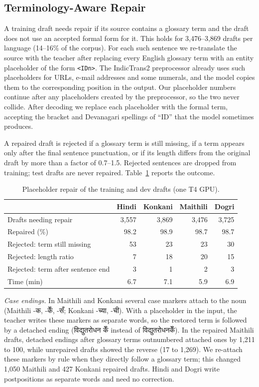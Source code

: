 \documentclass[conference]{IEEEtran}
\newcommand{\dev}[1]{{\devfont #1}}
\begin{document}
\subsection{Terminology-Aware Repair}
A training draft needs repair if its source contains a glossary term and the draft does not use an accepted formal form for it. This holds for 3,476--3,869 drafts per language (14--16\% of the corpus). For each such sentence we re-translate the source with the teacher after replacing every English glossary term with an entity placeholder of the form \texttt{<IDn>}. The IndicTrans2 preprocessor already uses such placeholders for URLs, e-mail addresses and some numerals, and the model copies them to the corresponding position in the output. Our placeholder numbers continue after any placeholders created by the preprocessor, so the two never collide. After decoding we replace each placeholder with the formal term, accepting the bracket and Devanagari spellings of ``ID'' that the model sometimes produces.

A repaired draft is rejected if a glossary term is still missing, if a term appears only after the final sentence punctuation, or if its length differs from the original draft by more than a factor of 0.7--1.5. Rejected sentences are dropped from training; test drafts are never repaired. Table~\ref{tab:repair} reports the outcome.

\begin{table}[t]
\caption{Placeholder repair of the training and dev drafts (one T4 GPU).}
\label{tab:repair}
\centering
\footnotesize
\begin{tabular}{@{}lrrrr@{}}
\toprule
 & Hindi & Konkani & Maithili & Dogri \\
\midrule
Drafts needing repair & 3,557 & 3,869 & 3,476 & 3,725 \\
Repaired (\%) & 98.2 & 98.9 & 98.7 & 98.7 \\
Rejected: term still missing & 53 & 23 & 23 & 30 \\
Rejected: length ratio & 7 & 18 & 20 & 15 \\
Rejected: term after sentence end & 3 & 1 & 2 & 3 \\
Time (min) & 6.7 & 7.1 & 5.9 & 6.9 \\
\bottomrule
\end{tabular}
\end{table}

\emph{Case endings.} In Maithili and Konkani several case markers attach to the noun (Maithili \dev{-क}, \dev{-केँ}, \dev{-सँ}; Konkani \dev{-च्या}, \dev{-ची}). With a placeholder in the input, the teacher writes these markers as separate words, so the restored term is followed by a detached ending (\dev{विद्युतरोधन केँ} instead of \dev{विद्युतरोधनकेँ}). In the repaired Maithili drafts, detached endings after glossary terms outnumbered attached ones by 1,211 to 100, while unrepaired drafts showed the reverse (17 to 1,269). We re-attach these markers by rule when they directly follow a glossary term; this changed 1,050 Maithili and 427 Konkani repaired drafts. Hindi and Dogri write postpositions as separate words and need no correction.
\end{document}

